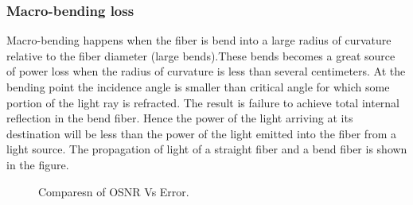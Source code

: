 \documentclass[12pt]{report}
\begin{document}
	\subsubsection{Macro-bending loss}
	Macro-bending happens when the fiber is bend into a large radius of curvature relative to the fiber diameter (large bends).These bends becomes a great source of power loss when the radius of curvature is less than several centimeters. At the bending point the incidence angle is smaller than critical angle for which some portion of the light ray is refracted. The result is failure to achieve total internal reflection in the bend fiber. Hence the power of the light arriving at its destination will be less than the power of the light emitted into the fiber from a light source. The propagation of light of a straight fiber and a bend fiber is shown in the figure. 
	\begin{figure}[htbp]
		\caption{Comparesn of OSNR Vs Error.}
		\label{fig1}
	\end{figure}
	
\end{document}
